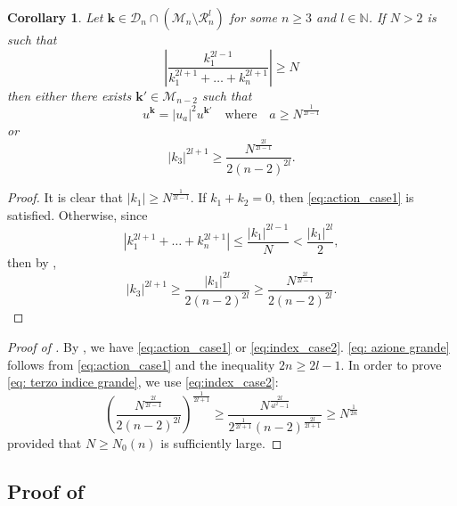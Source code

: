 \documentclass[a4paper,10pt,reqno]{article}
\theoremstyle{definition}
\theoremstyle{plain}
\theoremstyle{plain}
\theoremstyle{definition}
\theoremstyle{plain}
\newtheorem{cor}[definition]{Corollary}
\theoremstyle{plain}
\theoremstyle{plain}
\theoremstyle{definition}
\theoremstyle{definition}
\def \N{\mathbb N}
\def \M{\mathcal{M}}
\def \k{\bm{k}}
\begin{document}
\begin{cor} \label{secondo lemma algebrico bernier}
Let $\k \in \mathcal{D}_n \cap (\mathcal{M}_n \setminus \mathcal{R}_n^{l})$ for some $n \ge 3$ and $l \in \N$. 
If $N > 2$ is such that 
\[
\left \lvert \frac{k_1^{2l-1}}{k_1^{2l+1}+\ldots+k_n^{2l+1}} \right \rvert \ge N
\]
then either there exists $\k' \in \M_{n-2}$ such that 
\begin{equation}\label{eq:action_case1}
u^{\k} = |u_a|^2 u^{\k'} \quad \text{where} \quad a \ge N^{\frac{1}{2l-1}}
\end{equation}
or 
\begin{equation}\label{eq:index_case2}
|k_3|^{2l+1} \ge \frac{N^{\frac{2l}{2l-1}}}{2(n-2)^{2l}}.
\end{equation}
\end{cor}
\begin{proof}
It is clear that $|k_1| \ge N^{\frac{1}{2l-1}}$. 
If $k_1+k_2=0$, then \eqref{eq:action_case1} is satisfied. Otherwise, since 
\[
|k_1^{2l+1}+\ldots+k_n^{2l+1}| \le \frac{|k_1|^{2l-1}}{N} < \frac{|k_1|^{2l}}{2},
\]
then by ,
\[
|k_3|^{2l+1} \ge \frac{|k_1|^{2l}}{2(n-2)^{2l}} \ge \frac{N^{\frac{2l}{2l-1}}}{2(n-2)^{2l}}.
\]
\end{proof}

\begin{proof}[Proof of ]
By , we have \eqref{eq:action_case1} or \eqref{eq:index_case2}. \eqref{eq: azione grande} follows from \eqref{eq:action_case1} and the inequality $2n \ge 2l -1$. In order to prove \eqref{eq: terzo indice grande}, we use \eqref{eq:index_case2}:
\[
\left ( \frac{N^{\frac{2l}{2l-1}}}{2(n-2)^{2l}} \right )^{\frac{1}{2l+1}} \ge \frac{N^{\frac{2l}{4l^2-1}}}{2^{\frac{1}{2l+1}}(n-2)^{\frac{2l}{2l+1}}} \ge N^{\frac{1}{2n}}
\]
provided that $N \geq N_0 (n)$ is sufficiently large.
\end{proof}

\subsection{Proof of \texorpdfstring{}.} \label{app: normal form}
\end{document}
